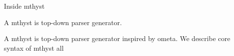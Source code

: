 Inside mthyst

A mthyst is top-down parser generator. 

A mthyst is top-down parser generator inspired by ometa. We describe core syntax of mthyst all 

